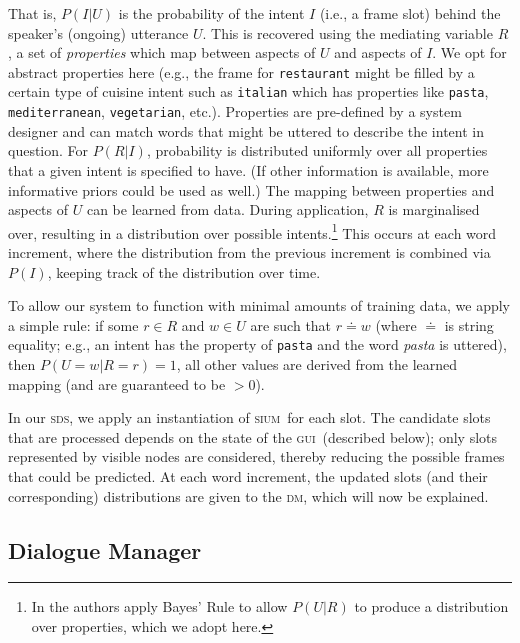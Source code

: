 \documentclass[11pt]{article}
\newcommand{\sds}[0]{\textsc{sds}}
\newcommand{\sium}[0]{\textsc{sium}}
\newcommand{\dm}[0]{\textsc{dm}}
\newcommand{\ui}[0]{\textsc{gui}}
\begin{document}
That is, $P(I|U)$ is the probability of the intent $I$ (i.e., a frame slot) behind the speaker's (ongoing) utterance $U$. This is recovered using the mediating variable $R$, a set of \emph{properties} which map between aspects of $U$ and aspects of $I$. We opt for abstract properties here (e.g., the frame for \texttt{restaurant} might be filled by a certain type of cuisine intent such as \texttt{italian} which has properties like \texttt{pasta}, \texttt{mediterranean}, \texttt{vegetarian}, etc.). Properties are pre-defined by a system designer and can match words that might be uttered to describe the intent in question. For $P(R|I)$, probability is distributed uniformly over all properties that a given intent is specified to have. (If other information is available, more informative priors could be used as well.) The mapping between properties and aspects of $U$ can be learned from data. During application, $R$ is marginalised over, resulting in a distribution over possible intents.\footnote{In  the authors apply Bayes' Rule to allow $P(U|R)$ to produce a distribution over properties, which we adopt here.} This occurs at each word increment, where the distribution from the previous increment is combined via $P(I)$, keeping track of the distribution over time. 

To allow our system to function with minimal amounts of training data, we apply a simple rule: if some $r \in R$ and $w \in U$ are such that $r\doteq w$  (where $\doteq$ is string equality; e.g., an intent has the property of \texttt{pasta} and the word \emph{pasta} is uttered), then $P(U=w|R=r) = 1$, all other values are derived from the learned mapping (and are guaranteed to be $>0$). 

In our \sds, we apply an instantiation of \sium\ for each slot. The candidate slots that are processed depends on the state of the \ui\ (described below); only slots represented by visible nodes are considered, thereby reducing the possible frames that could be predicted. At each word increment, the updated slots (and their corresponding) distributions are given to the \dm, which will now be explained. 

\subsection{Dialogue Manager}
\end{document}
